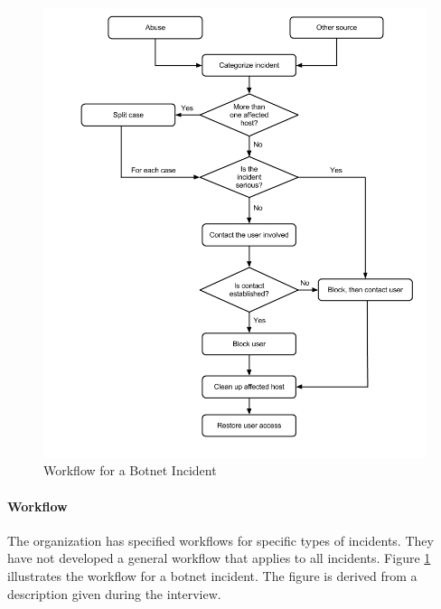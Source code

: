 \begin{figure}[H]
\hspace{-1.1cm}\includegraphics[scale=0.53]{WorkflowCaseABotnet.png}
\caption[Workflow for a Botnet Incident, Case A]{Workflow for a Botnet Incident}
\label{fig:WorkflowCaseABotnet}
\end{figure}

\paragraph{Workflow}
The organization has specified workflows for specific types of incidents. They have not developed a general workflow that applies to all incidents. Figure \ref{fig:WorkflowCaseABotnet} illustrates the workflow for a botnet incident. The figure is derived from a description given during the interview. 


